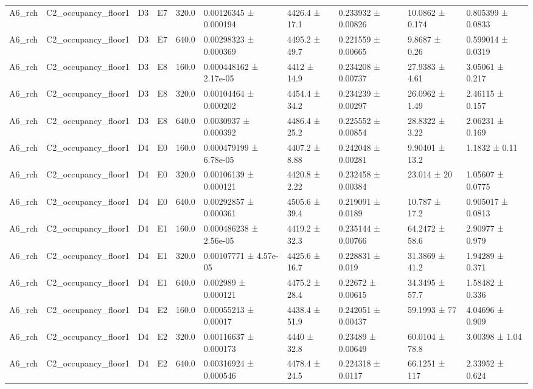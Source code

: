 \begin{table}
\begin{tabular}{llllllllll}
A6\_rch & C2\_occupancy\_floor1 & D3 & E7 & 320.0 & 0.00126345 ± 0.000194 & 4426.4 ± 17.1 & 0.233932 ± 0.00826 & 10.0862 ± 0.174 & 0.805399 ± 0.0833 \\
A6\_rch & C2\_occupancy\_floor1 & D3 & E7 & 640.0 & 0.00298323 ± 0.000369 & 4495.2 ± 49.7 & 0.221559 ± 0.00665 & 9.8687 ± 0.26 & 0.599014 ± 0.0319 \\
A6\_rch & C2\_occupancy\_floor1 & D3 & E8 & 160.0 & 0.000448162 ± 2.17e-05 & 4412 ± 14.9 & 0.234208 ± 0.00737 & 27.9383 ± 4.61 & 3.05061 ± 0.217 \\
A6\_rch & C2\_occupancy\_floor1 & D3 & E8 & 320.0 & 0.00104464 ± 0.000202 & 4454.4 ± 34.2 & 0.234239 ± 0.00297 & 26.0962 ± 1.49 & 2.46115 ± 0.157 \\
A6\_rch & C2\_occupancy\_floor1 & D3 & E8 & 640.0 & 0.0030937 ± 0.000392 & 4486.4 ± 25.2 & 0.225552 ± 0.00854 & 28.8322 ± 3.22 & 2.06231 ± 0.169 \\
A6\_rch & C2\_occupancy\_floor1 & D4 & E0 & 160.0 & 0.000479199 ± 6.78e-05 & 4407.2 ± 8.88 & 0.242048 ± 0.00281 & 9.90401 ± 13.2 & 1.1832 ± 0.11 \\
A6\_rch & C2\_occupancy\_floor1 & D4 & E0 & 320.0 & 0.00106139 ± 0.000121 & 4420.8 ± 2.22 & 0.232458 ± 0.00384 & 23.014 ± 20 & 1.05607 ± 0.0775 \\
A6\_rch & C2\_occupancy\_floor1 & D4 & E0 & 640.0 & 0.00292857 ± 0.000361 & 4505.6 ± 39.4 & 0.219091 ± 0.0189 & 10.787 ± 17.2 & 0.905017 ± 0.0813 \\
A6\_rch & C2\_occupancy\_floor1 & D4 & E1 & 160.0 & 0.000486238 ± 2.56e-05 & 4419.2 ± 32.3 & 0.235144 ± 0.00766 & 64.2472 ± 58.6 & 2.90977 ± 0.979 \\
A6\_rch & C2\_occupancy\_floor1 & D4 & E1 & 320.0 & 0.00107771 ± 4.57e-05 & 4425.6 ± 16.7 & 0.228831 ± 0.019 & 31.3869 ± 41.2 & 1.94289 ± 0.371 \\
A6\_rch & C2\_occupancy\_floor1 & D4 & E1 & 640.0 & 0.002989 ± 0.000121 & 4475.2 ± 28.4 & 0.22672 ± 0.00615 & 34.3495 ± 57.7 & 1.58482 ± 0.336 \\
A6\_rch & C2\_occupancy\_floor1 & D4 & E2 & 160.0 & 0.00055213 ± 0.00017 & 4438.4 ± 51.9 & 0.242051 ± 0.00437 & 59.1993 ± 77 & 4.04696 ± 0.909 \\
A6\_rch & C2\_occupancy\_floor1 & D4 & E2 & 320.0 & 0.00116637 ± 0.000173 & 4440 ± 32.8 & 0.23489 ± 0.00649 & 60.0104 ± 78.8 & 3.00398 ± 1.04 \\
A6\_rch & C2\_occupancy\_floor1 & D4 & E2 & 640.0 & 0.00316924 ± 0.000546 & 4478.4 ± 24.5 & 0.224318 ± 0.0117 & 66.1251 ± 117 & 2.33952 ± 0.624 \\

\end{tabular}
\end{table}

